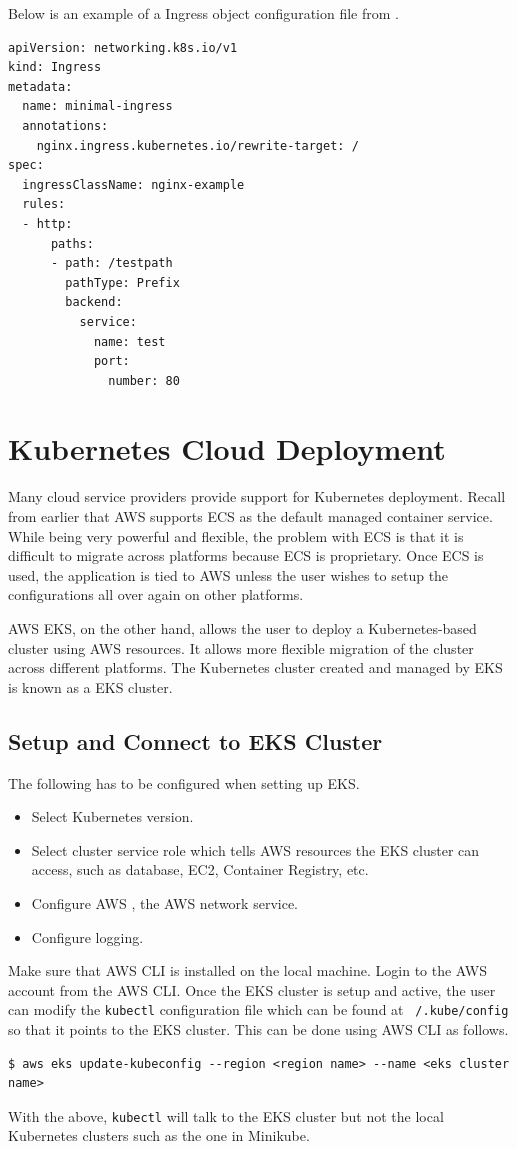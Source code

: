 Below is an example of a Ingress object configuration file from \cite{kubernetes2024doc}.
\begin{lstlisting}
apiVersion: networking.k8s.io/v1
kind: Ingress
metadata:
  name: minimal-ingress
  annotations:
    nginx.ingress.kubernetes.io/rewrite-target: /
spec:
  ingressClassName: nginx-example
  rules:
  - http:
      paths:
      - path: /testpath
        pathType: Prefix
        backend:
          service:
            name: test
            port:
              number: 80
\end{lstlisting}

\section{Kubernetes Cloud Deployment}

Many cloud service providers provide support for Kubernetes deployment. Recall from earlier that AWS supports ECS as the default managed container service. While being very powerful and flexible, the problem with ECS is that it is difficult to migrate across platforms because ECS is proprietary. Once ECS is used, the application is tied to AWS unless the user wishes to setup the configurations all over again on other platforms.

AWS EKS, on the other hand, allows the user to deploy a Kubernetes-based cluster using AWS resources. It allows more flexible migration of the cluster across different platforms. The Kubernetes cluster created and managed by EKS is known as a EKS cluster.

\subsection{Setup and Connect to EKS Cluster} \label{subsec:setupeks}

The following has to be configured when setting up EKS.

\begin{itemize}
  \item Select Kubernetes version.
  \item Select cluster service role which tells AWS resources the EKS cluster can access, such as database, EC2, Container Registry, etc. 
  \item Configure AWS , the AWS network service.
  \item Configure logging.
\end{itemize}

Make sure that AWS CLI is installed on the local machine. Login to the AWS account from the AWS CLI. Once the EKS cluster is setup and active, the user can modify the \verb|kubectl| configuration file which can be found at \texttt{~/.kube/config} so that it points to the EKS cluster. This can be done using AWS CLI as follows.
\begin{lstlisting}
$ aws eks update-kubeconfig --region <region name> --name <eks cluster name>
\end{lstlisting}
With the above, \verb|kubectl| will talk to the EKS cluster but not the local Kubernetes clusters such as the one in Minikube.

